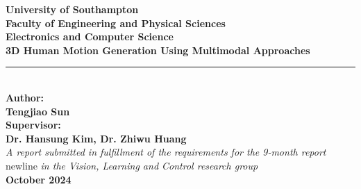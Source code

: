 \documentclass[a4paper, 12pt]{article}
\begin{document}
\begin{titlepage}
    \centering
    \vspace*{2cm}
    \textbf{\LARGE University of Southampton}\\[1.5cm]
    \textbf{\large Faculty of Engineering and Physical Sciences}\\
    \textbf{\large Electronics and Computer Science}\\[2cm]
    \textbf{\Huge 3D Human Motion Generation Using Multimodal Approaches}\\[1cm]
    \rule{\textwidth}{0.5pt}\\[0.4cm]
    \textbf{\large Author:}\\
    \textbf{\large Tengjiao Sun}\\[0.5cm]
    \textbf{\large Supervisor:}\\
    \textbf{\large Dr. Hansung Kim, Dr. Zhiwu Huang}\\[2cm]
    \textit{A report submitted in fulfillment of the requirements for the 9-month report}\\newline 
    \textit{in the Vision, Learning and Control research group}\\[1.5cm]
    \textbf{\large October 2024}\\[2cm]
\end{titlepage}

\begin{abstract}
Text-to-motion generation has emerged as a promising field in artificial intelligence, showcasing the potential to create realistic and dynamic motion sequences from simple text inputs. However, the task remains challenging due to the inherent complexity of translating abstract textual descriptions into accurate motion representations. This research investigates the key challenges in text-to-motion generation, focusing on improving the flexibility and control of generated motion sequences. I introduce a novel approach that leverages multimodal representations to bridge the gap between text prompts and motion generation, enabling more precise and versatile motion editing. The study explores the potential for enhancing motion editing capabilities by integrating text and motion data, offering new insights into how AI models can be refined to better handle multimodal inputs. This report outlines the progress made in the first nine months of doctoral research and sets the stage for further exploration in motion generation and editing.
\end{abstract}

\newpage 
\tableofcontents
\newpage 
\end{document}
